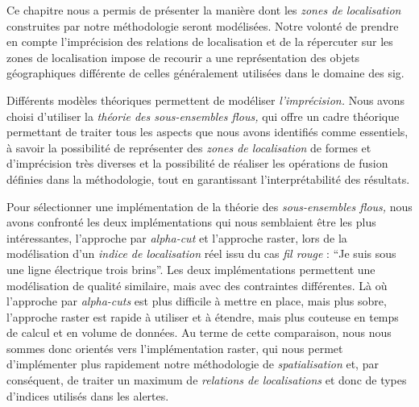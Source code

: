 Ce chapitre nous a permis de présenter la manière dont les \emph{zones
  de localisation} construites par notre méthodologie seront
modélisées. Notre volonté de prendre en compte l'imprécision des
relations de localisation et de la répercuter sur les zones de
localisation impose de recourir a une représentation des objets
géographiques différente de celles généralement utilisées dans le
domaine des \ac{sig}.

Différents modèles théoriques permettent de modéliser
\emph{l'imprécision.} Nous avons choisi d'utiliser la \emph{théorie
  des sous-ensembles flous,} qui offre un cadre théorique permettant
de traiter tous les aspects que nous avons identifiés comme
essentiels, à savoir la possibilité de représenter des \emph{zones de
  localisation} de formes et d'imprécision très diverses et la
possibilité de réaliser les opérations de fusion définies dans la
méthodologie, tout en garantissant l'interprétabilité des résultats.

Pour sélectionner une implémentation de la théorie des
\emph{sous-ensembles flous,} nous avons confronté les deux
implémentations qui nous semblaient être les plus intéressantes,
l'approche par \emph{alpha-cut} et l'approche raster, lors de la
modélisation d'un \emph{indice de localisation} réel issu du cas
\emph{fil rouge} : \enquote{Je suis sous une ligne électrique trois
  brins}. Les deux implémentations permettent une modélisation de
qualité similaire, mais avec des contraintes différentes. Là où
l'approche par \emph{alpha-cuts} est plus difficile à mettre en place,
mais plus sobre, l'approche raster est rapide à utiliser et à étendre,
mais plus couteuse en temps de calcul et en volume de données. Au
terme de cette comparaison, nous nous sommes donc orientés vers
l'implémentation raster, qui nous permet d’implémenter plus rapidement
notre méthodologie de \emph{spatialisation} et, par conséquent, de
traiter un maximum de \emph{relations de localisations} et donc de
types d'indices utilisés dans les alertes.

